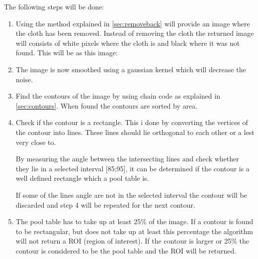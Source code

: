The following steps will be done:
\begin{enumerate}
\item Using the method explained in \ref{sec:removeback} will provide an image where the cloth has been removed. Instead of removing the cloth the returned image will consists of white pixels where the cloth is and black where it was not found. This will be as this image:


\item The image is now smoothed using a gaussian kernel which will decrease the noise.

\item Find the contours of the image by using chain code as explained in \ref{sec:contours}. When found the contours are sorted by area.

\item Check if the contour is a rectangle. This i done by converting the vertices of the contour into lines. These lines should lie orthogonal to each other or a lest very close to.

By measuring the angle between the intersecting lines and check whether they lie in a selected interval [85\degree;95\degree], it can be determined if the contour is a well defined rectangle which a pool table is.

If some of the lines angle are not in the selected interval the contour will be discarded and step 4 will be repeated for the next contour.

\item The pool table has to take up at least 25\% of the image. If a contour is found to be rectangular, but does not take up at least this percentage the algorithm will not return a ROI (region of interest). If the contour is larger or 25\% the contour is considered to be the pool table and the ROI will be returned.
\end{enumerate}